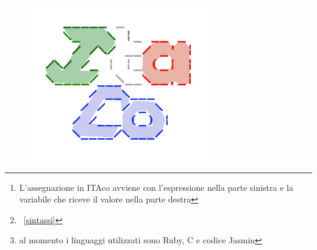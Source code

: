 \documentclass[11pt, a4paper, twoside, notitlepage]{report}
\begin{document}
\thispagestyle{empty} %
\clearpage
\begin{figure}[h] \hspace*{140pt}
\includegraphics[scale=0.5]{img/itaco_logo.png}
\end{figure}
\begin{abstract}
Questo documento riassume brevemente le peculiarità principali del progetto
ITAco da un punto di vista interessato alla dimostrazione ai fini accademici
delle competenze acquisite dagli autori dello stesso nell'ambito della creazione
di linguaggi e compilatori.
\\Il nome è stato scelto seguendo l'idea iniziale di creare un linguaggio di
programmazione molto semplice e intuitivo in lingua italiana, affinché possa
essere facile da utilizzare e didatticamente proficuo per delle categorie di
utenti che possono incontrare difficoltà nella memorizzazione di parole chiave
in lingua straniera.
\\Con lo scopo di perseguire questo obiettivo sono state prese decisioni quali
l'inversione del normale assegnamento dei valori\footnote{L'assegnazione in
ITAco avviene con l'espressione nella parte sinistra e la variabile che riceve
il valore nella parte destra}, che, sebbene risulti a un primo impatto
sconveniente a un utente abituato ad altri linguaggio di programmazione, è
tuttavia molto più intuitivo per un utente abituato ad utilizzare la logica
\emph{della calcolatrice} dove prima si inseriscono i valori e
successivamente li si assegna a una varabile.
\\Altre caratteristiche con questo obiettivo possono essere lette nella sezione
riguardante la sintassi\footnote{~\ref{sintassi}}. Nell'ambito della facilità di
utilizzo rientrano le scelte di una intuitiva interfaccia grafica mentre,
nell'ambito didattico, la possibilità di traduttre il programma scritto in
diversi linguaggi\footnote{al momento i linguaggi utilizzati sono Ruby, C e
codice Jasmin}.
Questi argomenti sono descritti rispettivamente nella sezione ~\ref{gui} e al capitolo ~\ref{back_end}.
\\Viene inoltre descritto anche l'utilizzo gli strumenti, sia teorici che
pratici, utilizzati per la realizzazione del progetto quali JFlex, CUP, le produzioni
della grammatica utilizzata, i test automatici.

\begin{flushright}
{\bf Keywords:} Compilatori, Cup, JFlex
\end{flushright}
\end{abstract}
\end{document}
